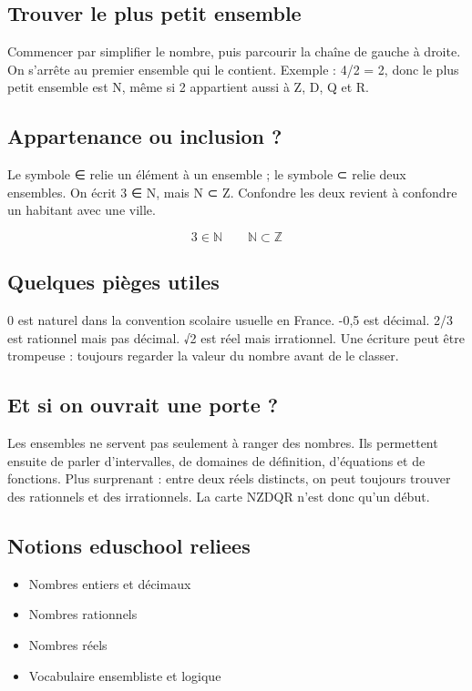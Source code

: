 \documentclass[
]{article}
\providecommand{\tightlist}{%
  \setlength{\itemsep}{0pt}\setlength{\parskip}{0pt}}
\begin{document}
\subsection{Trouver le plus petit
ensemble}\label{trouver-le-plus-petit-ensemble}

Commencer par simplifier le nombre, puis parcourir la chaîne de gauche à
droite. On s'arrête au premier ensemble qui le contient. Exemple : 4/2 =
2, donc le plus petit ensemble est N, même si 2 appartient aussi à Z, D,
Q et R.

\subsection{Appartenance ou inclusion
?}\label{appartenance-ou-inclusion}

Le symbole ∈ relie un élément à un ensemble ; le symbole ⊂ relie deux
ensembles. On écrit 3 ∈ N, mais N ⊂ Z. Confondre les deux revient à
confondre un habitant avec une ville.

\[
3 \in \mathbb{N} \qquad \mathbb{N} \subset \mathbb{Z}
\]

\subsection{Quelques pièges utiles}\label{quelques-piuxe8ges-utiles}

0 est naturel dans la convention scolaire usuelle en France. -0,5 est
décimal. 2/3 est rationnel mais pas décimal. √2 est réel mais
irrationnel. Une écriture peut être trompeuse : toujours regarder la
valeur du nombre avant de le classer.

\subsection{Et si on ouvrait une porte
?}\label{et-si-on-ouvrait-une-porte}

Les ensembles ne servent pas seulement à ranger des nombres. Ils
permettent ensuite de parler d'intervalles, de domaines de définition,
d'équations et de fonctions. Plus surprenant : entre deux réels
distincts, on peut toujours trouver des rationnels et des irrationnels.
La carte NZDQR n'est donc qu'un début.

\subsection{Notions eduschool reliees}\label{notions-eduschool-reliees}

\begin{itemize}
\tightlist
\item
  Nombres entiers et décimaux
\item
  Nombres rationnels
\item
  Nombres réels
\item
  Vocabulaire ensembliste et logique
\end{itemize}
\end{document}
